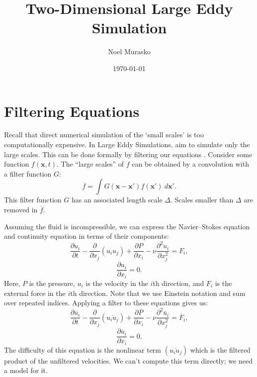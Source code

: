 \documentclass[11pt,a4paper]{article}
\author{Noel Murasko}
\title{Two-Dimensional Large Eddy Simulation}
\date{\today}
\begin{document}
\maketitle
\noindent 
\section{Filtering Equations}
Recall that direct numerical simulation of the `small scales' is too computationally expensive. In Large Eddy Simulations, aim to simulate only the large scales. This can be done formally by filtering our equations \cite{Leonard1974}. Consider some function $f(\boldsymbol{x}, t)$. The ``large scales'' of $f$ can be obtained by a convolution with a filter function $G$:
$$\overline{f} = \int G(\boldsymbol{x} - \boldsymbol{x}')f(\boldsymbol{x}')\ d\boldsymbol{x}'.$$
This filter function $G$ has an associated length scale $\Delta$. Scales smaller than $\Delta$ are removed in $\overline{f}$. 

Assuming the fluid is incompressible, we can express the Navier--Stokes equation and continuity equation in terms of their components:
$$\frac{\partial u_i}{\partial t} - \frac{\partial }{\partial x_j}(u_iu_j)+\frac{\partial P}{\partial x_i}- \nu \frac{\partial^2u_i}{\partial x_j^2} = F_i,$$
$$\frac{\partial u_i}{\partial x_i}  =0.$$
Here, $P$ is the pressure, $u_i$ is the velocity in the $i$th direction, and $F_i$ is the external force in the $i$th direction. Note that we use Einstein notation and sum over repeated indices. Applying a filter to these equations gives us:
$$\frac{\partial \overline{u}_i}{\partial t} - \frac{\partial }{\partial x_j}\left(\overline{u_iu_j}\right)+\frac{\partial \overline{P}}{\partial x_i}- \nu \frac{\partial^2\overline{u}_i}{\partial x_j^2}= \overline{F}_i,$$
$$\frac{\partial \overline{u}_i}{\partial x_i}  =0.$$
The difficulty of this equation is the nonlinear term $\left(\overline{u_iu_j}\right)$ which is the filtered product of the unfiltered velocities. We can't compute this term directly; we need a model for it.
\end{document}
